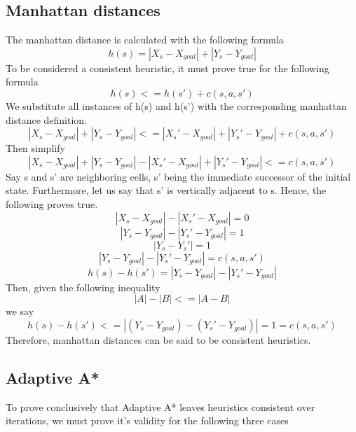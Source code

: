 \documentclass{article}
\begin{document}
\subsection{Manhattan distances}
The manhattan distance is calculated with the following formula
\begin{equation}
	h(s) = |X_s - X_{goal}| + |Y_s - Y_{goal}|
\end{equation}
To be considered a consistent heuristic, it must prove true for the following formula
\begin{equation}
	h(s) <= h(s')+c(s,a,s')
\end{equation}
 We substitute all instances of h(s) and h(s') with the corresponding manhattan distance definition.
\begin{equation}
	|X_s - X_{goal}| + |Y_s - Y_{goal}| <= |X_s' - X_{goal}| + |Y_s' - Y_{goal}| + c(s,a,s')
\end{equation}
Then simplify
\begin{equation}
	|X_s - X_{goal}| + |Y_s - Y_{goal}| - |X_s' - X_{goal}| + |Y_s' - Y_{goal}| <= c(s,a,s')
\end{equation}
Say s and s' are neighboring cells, s' being the immediate successor of the initial state. Furthermore, let us say that s' is vertically adjacent to s. Hence, the following proves true.
\begin{equation}
	|X_s - X_{goal}| - |X_s' - X_{goal}| = 0	
\end{equation}
\begin{equation} 
	|Y_s - Y_{goal}| - |Y_s' - Y_{goal}| = 1
\end{equation}
\begin{equation} 
	|Y_s - Y_s'| = 1
\end{equation}
\begin{equation} 
	|Y_s - Y_{goal}| - |Y_s' - Y_{goal}| = c(s,a,s')
\end{equation}
\begin{equation} 
	h(s) - h(s') = |Y_s - Y_{goal}| - |Y_s' - Y_{goal}|
\end{equation}
Then, given the following inequality
\begin{equation}
	|A| - |B| <= |A-B|
\end{equation}
we say
\begin{equation}
	h(s) - h(s') <= |(Y_s - Y_{goal}) - (Y_s' - Y_{goal})|
		= 1
		= c(s,a,s')
\end{equation}
Therefore, manhattan distances can be said to be consistent heuristics.
\subsection{Adaptive A*}
To prove conclusively that Adaptive A* leaves heuristics consistent over iterations, we must prove it's validity for the following three cases
\end{document}
